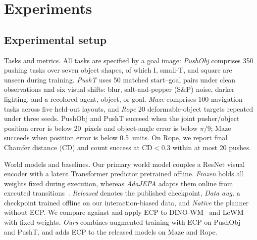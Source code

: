 \section{Experiments}
\label{sec:experiments}


\subsection{Experimental setup}
\par\smallskip\noindent Tasks and metrics.
All tasks are specified by a goal image: \emph{PushObj} comprises 350 pushing tasks over seven object shapes, of which I, small-T, and square are unseen during training. \emph{PushT} uses 50 matched start--goal pairs under clean observations and six visual shifts: blur, salt-and-pepper (S\&P) noise, darker lighting, and a recolored agent, object, or goal. \emph{Maze} comprises 100 navigation tasks across five held-out layouts, and \emph{Rope} 20 deformable-object targets repeated under three seeds. PushObj and PushT succeed when the joint pusher/object position error is below 20~pixels and object-angle error is below $\pi/9$; Maze succeeds when position error is below 0.5~units. On Rope, we report final Chamfer distance (CD) and count success at $\text{CD}<0.3$ within at most 20 pushes.

\par\smallskip\noindent World models and baselines.
Our primary world model couples a ResNet visual encoder with a latent Transformer predictor pretrained offline. \emph{Frozen} holds all weights fixed during execution, whereas \emph{AdaJEPA} adapts them online from executed transitions~\cite{wang2026adajepa}. \emph{Released} denotes the published checkpoint, \emph{Data aug.} a checkpoint trained offline on our interaction-biased data, and \emph{Native} the planner without ECP. We compare against and apply ECP to DINO-WM~\cite{zhou2025dinowm} and LeWM~\cite{maes2026lewm} with fixed weights. \emph{Ours} combines augmented training with ECP on PushObj and PushT, and adds ECP to the released models on Maze and Rope.

